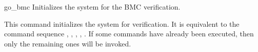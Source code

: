 \begin{nusmvCommand} {go\_bmc} {Initializes the system for the BMC verification.}


This command initializes the system for verification. It is equivalent
to the command sequence ,
, , \linebreak
{}, .  If some
commands have already been executed, then only the remaining ones will
be invoked.

\end{nusmvCommand}
